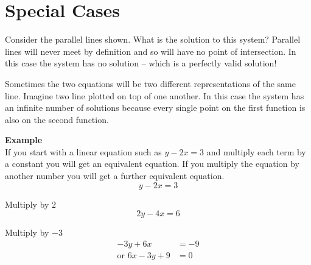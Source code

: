  \section*{Special Cases}
  \begin{multicols}{2}
  Consider the parallel lines shown. What is the solution to this system? Parallel lines will never meet by definition and so will have no point of intersection. In this case the system has no solution -- which is a perfectly valid solution!
  
  Sometimes the two equations will be two different representations of the same line. Imagine two line plotted on top of one another. In this case the system has an infinite number of solutions because every single point on the first function is also on the second function. 
 	\columnbreak
 	\begin{center}
 	\end{center}
 \end{multicols}
 
 \textbf{Example}\\
 If you start with a linear equation such as $y -2 x =3$ and multiply each term by a constant you will get an equivalent equation. If you multiply the equation by another number you
 will get a further equivalent equation.
 \begin{equation*}y -2 x =3
 \end{equation*}
 
 Multiply by $2$
 \begin{equation*}2 y -4 x =6
 \end{equation*}
 
 Multiply by $ -3$
 \begin{align*} -3 y +6 x &  =   -9 \\
 \text{or }6 x -3 y +9 &  =  0\end{align*}
 
